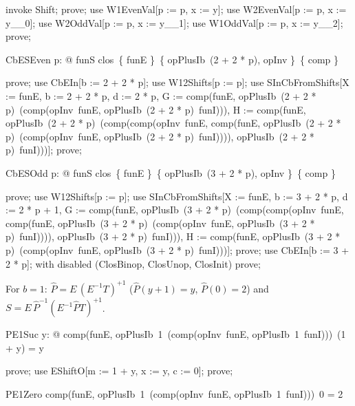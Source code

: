 \documentclass{article}
\begin{document}
\begin{zproof}
invoke Shift;
prove;
use W1EvenVal[p := p, x := y];
use W2EvenVal[p := p, x := y\_\_0];
use W2OddVal[p := p, x := y\_\_1];
use W1OddVal[p := p, x := y\_\_2];
prove;
\end{zproof}

\begin{theorem}{CbESEven}
  \forall p: \nat @ funS \in clos~\{ funE \}~\{ opPlusIb~(2 + 2 * p), opInv \}~\{ comp \}
\end{theorem}

\begin{zproof}
prove;
use CbEIn[b := 2 + 2 * p];
use W12Shifts[p := p];
use SInCbFromShifts[X := funE, b := 2 + 2 * p, d := 2 * p, G := comp(funE, opPlusIb~(2 + 2 * p)~(comp(opInv~funE, opPlusIb~(2 + 2 * p)~funI))), H := comp(funE, opPlusIb~(2 + 2 * p)~(comp(comp(opInv~funE, comp(funE, opPlusIb~(2 + 2 * p)~(comp(opInv~funE, opPlusIb~(2 + 2 * p)~funI)))), opPlusIb~(2 + 2 * p)~funI)))];
prove;
\end{zproof}

\begin{theorem}{CbESOdd}
  \forall p: \nat @ funS \in clos~\{ funE \}~\{ opPlusIb~(3 + 2 * p), opInv \}~\{ comp \}
\end{theorem}

\begin{zproof}
prove;
use W12Shifts[p := p];
use SInCbFromShifts[X := funE, b := 3 + 2 * p, d := 2 * p + 1, G := comp(funE, opPlusIb~(3 + 2 * p)~(comp(comp(opInv~funE, comp(funE, opPlusIb~(3 + 2 * p)~(comp(opInv~funE, opPlusIb~(3 + 2 * p)~funI)))), opPlusIb~(3 + 2 * p)~funI))), H := comp(funE, opPlusIb~(3 + 2 * p)~(comp(opInv~funE, opPlusIb~(3 + 2 * p)~funI)))];
prove;
use CbEIn[b := 3 + 2 * p];
with disabled (ClosBinop, ClosUnop, ClosInit) prove;
\end{zproof}


For $b = 1$: $\hat P = E\,(E^{-1} T)^{+1}$ ($\hat P(y + 1) = y$, $\hat P(0) = 2$) and
$S = E\,\hat P^{-1} (E^{-1} \hat P T)^{+1}$.

\begin{theorem}{PE1Suc}
  \forall y: \nat @ comp(funE, opPlusIb~1~(comp(opInv~funE, opPlusIb~1~funI)))~(1 + y) = y
\end{theorem}

\begin{zproof}
prove;
use EShiftO[m := 1 + y, x := y, c := 0];
prove;
\end{zproof}

\begin{theorem}{PE1Zero}
  comp(funE, opPlusIb~1~(comp(opInv~funE, opPlusIb~1~funI)))~0 = 2
\end{theorem}
\end{document}
